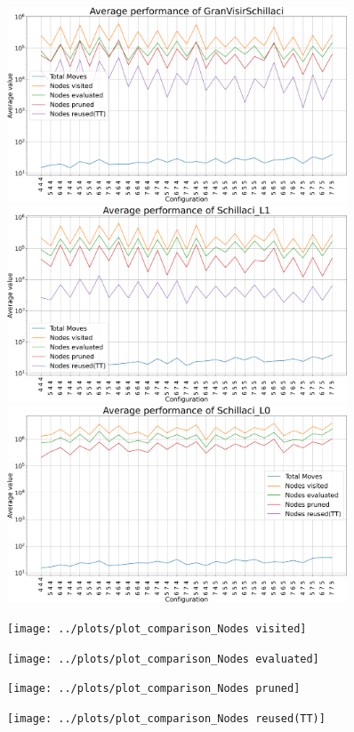 \begin{center}
    \begin{figure}[!htb]
        \includegraphics[width=0.9\textwidth]{images/plot_GranVisirSchillaci}


        \includegraphics[width=0.9\textwidth]{images/plot_Schillaci_L1}


        \includegraphics[width=0.9\textwidth]{images/plot_Schillaci_L0}
    \end{figure}
\end{center}

\begin{figure}[!htb]
    \texttt{[image: ../plots/plot\_comparison\_Nodes visited]}


    \texttt{[image: ../plots/plot\_comparison\_Nodes evaluated]}
\end{figure}

\begin{figure}[!htb]
    \texttt{[image: ../plots/plot\_comparison\_Nodes pruned]}


    \texttt{[image: ../plots/plot\_comparison\_Nodes reused(TT)]}
\end{figure}
